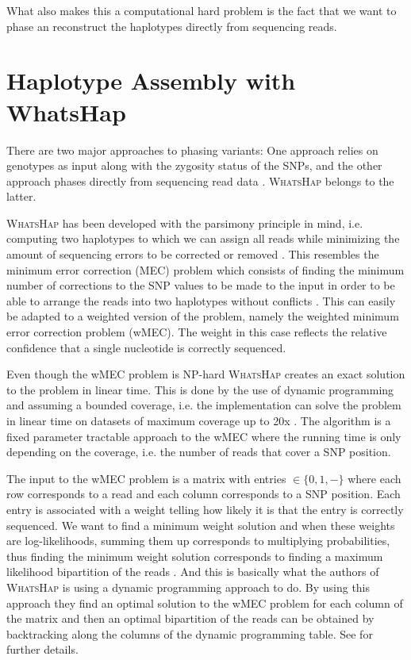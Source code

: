 \documentclass[10pt,a4paper]{article}
\begin{document}
What also makes this a computational hard problem is the fact that we want to phase an reconstruct the haplotypes directly from sequencing reads. 

\section{Haplotype Assembly with WhatsHap}
There are two major approaches to phasing variants: One approach relies on genotypes as input along with the zygosity status of the SNPs, and the other approach phases directly from sequencing read data \cite{whatshap}. \textsc{WhatsHap} belongs to the latter. 

\textsc{WhatsHap} has been developed with the parsimony principle in mind, i.e. computing two haplotypes to which we can assign all reads while minimizing the amount of sequencing errors to be corrected or removed \cite{whatshap}. This resembles the minimum error correction (MEC) problem which consists of finding the minimum number of corrections to the SNP values to be made to the input in order to be able to arrange the reads into two haplotypes without conflicts \cite{whatshap}. This can easily be adapted to a weighted version of the problem, namely the weighted minimum error correction problem (wMEC). The weight in this case reflects the relative confidence that a single nucleotide is correctly sequenced.

Even though the wMEC problem is NP-hard \textsc{WhatsHap} creates an exact solution to the problem in linear time. This is done by the use of dynamic programming and assuming a bounded coverage, i.e. the implementation can solve the problem in linear time on datasets of maximum coverage up to 20x \cite{whatshap}. The algorithm is a fixed parameter tractable approach to the wMEC where the running time is only depending on the coverage, i.e. the number of reads that cover a SNP position.

The input to the wMEC problem is a matrix with entries $\in\{0, 1, -\}$ where each row corresponds to a read and each column corresponds to a SNP position. Each entry is associated with a weight telling how likely it is that the entry is correctly sequenced. We want to find a minimum weight solution and when these weights are log-likelihoods, summing them up corresponds to multiplying probabilities, thus finding the minimum weight solution corresponds to finding a maximum likelihood bipartition of the reads \cite{whatshap}. And this is basically what the authors of \textsc{WhatsHap} is using a dynamic programming approach to do. By using this approach they find an optimal solution to the wMEC problem for each column of the matrix and then an optimal bipartition of the reads can be obtained by backtracking along the columns of the dynamic programming table. See \cite{whatshap} for further details.
\end{document}
